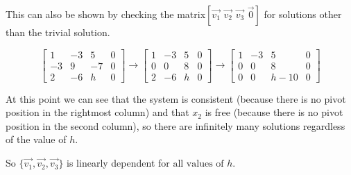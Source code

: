 \documentclass[12pt, oneside]{article}   	%
\begin{document}
This can also be shown by checking the matrix$[\vec{v_1}\,\,\vec{v_2}\,\,\vec{v_3}\,\,\vec{0}]$ for solutions other than the trivial solution.

\[  \left[ \begin{array}{rrrr}
1&-3&5&0\\
-3&9&-7&0\\
2&-6&h&0\end{array}\right ]\rightarrow
\left[ \begin{array}{rrrr}
1&-3&5&0\\
0&0&8&0\\
2&-6&h&0\end{array}\right ]\rightarrow
\left[ \begin{array}{rrcr}
1&-3&5&0\\
0&0&8&0\\
0&0&h-10&0\end{array}\right ]\]

At this point we can see that the system is consistent (because there is no pivot position in the rightmost column) and that $x_2$ is free (because there is no pivot position in the second column), so there are infinitely many solutions regardless of the value of $h$.


So $\{\vec{v_1},\vec{v_2},\vec{v_3}\}$ is linearly dependent for $\boxed{\textrm{all values of }h}$.
\end{document}
